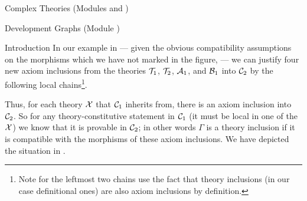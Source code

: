 \begin{tchapter}[id=complex-theories,short=Complex Theories]{Complex Theories (Modules
    {} and {})}
\begin{tsection}[id=development-graphs,short=Development Graphs]{Development Graphs
    (Module {})}
\begin{tsubsection}[id=dg-intro,short=Introduction]{Introduction}
In our example in {} --- given the obvious compatibility assumptions
on the morphisms which we have not marked in the figure, --- we can justify four new axiom
inclusions from the theories ${\cal T}_1$, ${\cal T}_2$, ${\cal A}_1$, and ${\cal B}_1$ into ${\cal C}_2$ by the
following local chains\footnote{Note for the leftmost two chains use the fact that theory
  inclusions (in our case definitional ones) are also axiom inclusions by
  definition.}.
\begin{center}
\end{center}

Thus, for each theory ${\cal X}$ that ${\cal C}_1$ inherits from, there is an axiom inclusion into
${\cal C}_2$. So for any theory-constitutive statement in ${\cal C}_1$ (it must be local in one of
the ${\cal X}$) we know that it is provable in ${\cal C}_2$; in other words $\Gamma$ is a theory
inclusion if it is compatible with the morphisms of these axiom inclusions.  We have
depicted the situation in {}.


\end{tsubsection}
\end{tsection}
\end{tchapter}
